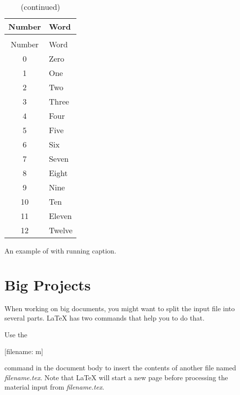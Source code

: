 \begin{listing}
  \begin{lined}{0.8\linewidth}
    \begin{example}[standalone,
    to_page=2,
    paperwidth=4.1cm,
    paperheight=4cm,
    vertical_pages,
]
\usepackage{longtable}
\usepackage{booktabs}


\begin{longtable}{@{}cl@{}}
  \caption{Numbers}       \\
  \toprule
  Number & Word           \\
  \midrule \endfirsthead

  \caption[]{(continued)} \\
  \toprule
  Number & Word           \\
  \midrule \endhead

  \bottomrule \endfoot
  \bottomrule \endlastfoot

  0      & Zero   \\
  1      & One    \\
  2      & Two     \\
  3      & Three \\
  4      & Four  \\
  5      & Five  \\
  6      & Six   \\
  7      & Seven \\
  8      & Eight \\
  9      & Nine  \\
  10     & Ten    \\
  11     & Eleven \\
  12     & Twelve \\
\end{longtable}
\end{example}
  \end{lined}
  \caption{An example of  with running caption.}\label{lst:longrunningcaption}
\end{listing}

\section{Big Projects}
When working on big documents, you might want to split the input file
into several parts. \LaTeX{} has two commands that help you to do
that.

Use the
\begin{lscommand}
  [filename: m]
\end{lscommand}
command in the document body to insert the contents of another file named
\emph{filename.tex}. Note that \LaTeX{} will start a new page before processing
the material input from \emph{filename.tex}.


